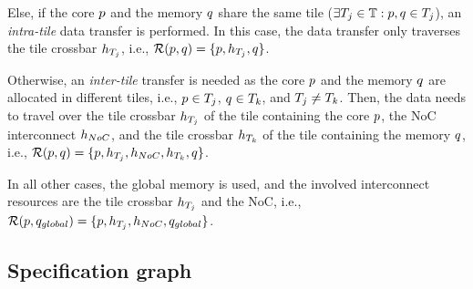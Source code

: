 \par
Else, if the core $p$ and the memory $q$ share the same tile ($\exists T_j \in \mathbb{T}: p, q \in T_j$), an \emph{intra-tile} data transfer is performed.
In this case, the data transfer only traverses the tile crossbar ${h_{T_{j}}}$, i.e., $\mathcal{R}(p, q) = \{ p, {h_{T_{j}}}, q \}$.
\par
Otherwise, an \emph{inter-tile} transfer is needed as the core $p$ and the memory $q$ are allocated in different tiles, i.e., $p \in T_j$, $q \in T_k$, and $T_j \neq T_k$.
Then, the data needs to travel over the tile crossbar ${h_{T_{j}}}$ of the tile containing the core $p$, the \ac{NoC} interconnect $h_{NoC}$, and the tile crossbar ${h_{T_{k}}}$ of the tile containing the memory $q$, i.e., $\mathcal{R}(p, q) = \{ p, {h_{T_{j}}}, h_{NoC}, {h_{T_{k}}}, q \}$.
\par
In all other cases, the global memory is used, and the involved interconnect resources are the tile crossbar ${h_{T_{j}}}$ and the \ac{NoC}, i.e., $\mathcal{R}(p, q_{global}) = \{ p, {h_{T_{j}}}, h_{NoC}, q_{global}\}$.

\subsection{Specification graph}\label{sec:specification}

